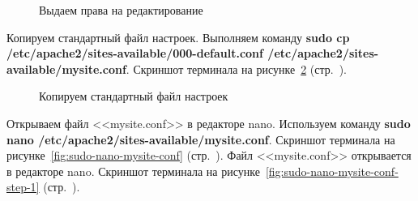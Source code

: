 \begin{figure}[p]
    \caption{Выдаем права на редактирование}
    \label{fig:sudo-chown}
\end{figure}

Копируем стандартный файл настроек. Выполняем команду \textbf{sudo cp /etc/apache2/sites-available/000-default.conf /etc/apache2/sites-available/mysite.conf}.
Скриншот терминала на рисунке~\ref{fig:sudo-cp-mysite-conf} (стр.~\pageref{fig:sudo-cp-mysite-conf}).

\begin{figure}[p]
    \caption{Копируем стандартный файл настроек}
    \label{fig:sudo-cp-mysite-conf}
\end{figure}

Открываем файл <<mysite.conf>> в редакторе nano. Используем команду \textbf{sudo nano /etc/apache2/sites-available/mysite.conf}.
Скриншот терминала на рисунке~\ref{fig:sudo-nano-mysite-conf} (стр.~\pageref{fig:sudo-nano-mysite-conf}).
Файл <<mysite.conf>> открывается в редакторе nano.
Скриншот терминала на рисунке~\ref{fig:sudo-nano-mysite-conf-step-1} (стр.~\pageref{fig:sudo-nano-mysite-conf-step-1}).

